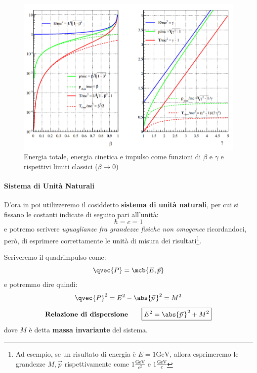 \begin{figure}[ht]
	\centering
	\includegraphics[scale=0.4]{./img/2020_03_20/realtivity_lectures.png}
	\caption{Energia totale, energia cinetica e impulso come funzioni di
		$\beta$ e $\gamma$ e rispettivi limiti classici ($\beta\to 0$)
	}
\end{figure}

\paragraph{Sistema di Unità Naturali}
D'ora in poi utilizzeremo il cosiddetto \textbf{sistema di unità naturali}, per
cui si fissano le costanti indicate di seguito pari all'unità:
\begin{equation}
	\boxed{\hbar = c = 1}
\end{equation}
e potremo scrivere \textit{uguaglianze fra grandezze fisiche non omogenee}
ricordandoci, però, di esprimere correttamente le unità di misura dei
risultati\footnote{
	Ad esempio, se un risultato di energia è $E = 1\si{\GeV}$, allora esprimeremo
	le grandezze $M,\vec{p}$ rispettivamente come $1\frac{\si{\GeV}}{c^2}$ e
	$1\frac{\si{\GeV}}{c}$
}.

Scriveremo il quadrimpulso come:
\begin{equation}
	\qvec{P} = \mcb{E,\vec{p}}
\end{equation}
e potremmo dire quindi:
\begin{equation}
	\qvec{P}^2 = E^2-\abs{\vec{p}\,}^2 = M^2
\end{equation}
\begin{equation}
	\textbf{Relazione di dispersione}
	\qquad
	\boxed{
		E^2 = \abs{\vec{p}\,}^2 + M^2
	}
\end{equation}
dove $M$ è detta \textbf{massa invariante} del sistema.

